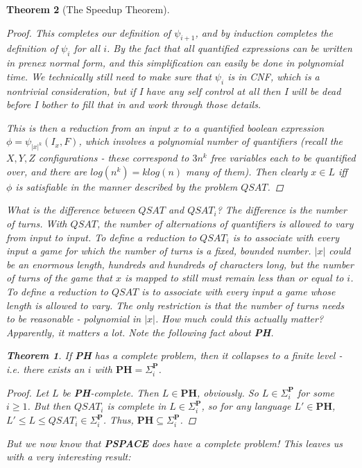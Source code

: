 \documentclass{article}
\theoremstyle{definition}
\theoremstyle{plain}
\theoremstyle{theorem}
\newtheorem{theorem}{Theorem}[section]
\begin{document}
\begin{theorem}[The Speedup Theorem]
\begin{proof}
    \par This completes our definition of $\psi_{i+1}$, and by induction completes the definition of $\psi_i$ for all $i$. By the fact that all quantified expressions can be written in prenex normal form, and this simplification can easily be done in polynomial time. We technically still need to make sure that $\psi_i$ is in CNF, which is a nontrivial consideration, but if I have any self control at all then I will be dead before I bother to fill that in and work through those details.
    \par This is then a reduction from an input $x$ to a quantified boolean expression $\phi = \psi_{|x|^k}(I_x,F)$, which involves a polynomial number of quantifiers (recall the $X,Y,Z$ configurations - these correspond to $3n^k$ free variables each to be quantified over, and there are $log(n^k)=klog(n)$ many of them). Then clearly $x \in L$ iff $\phi$ is satisfiable in the manner described by the problem $QSAT$.  
\end{proof}
What is the difference between $QSAT$ and $QSAT_i$? The difference is the number of turns. With $QSAT$, the number of alternations of quantifiers is allowed to vary from input to input. To define a reduction to $QSAT_i$ is to associate with every input a game for which the number of turns is a fixed, bounded number. $|x|$ could be an enormous length, hundreds and hundreds of characters long, but the number of turns of the game that $x$ is mapped to still must remain less than or equal to $i$. To define a reduction to $QSAT$ is to associate with every input a game whose length is allowed to vary. The only restriction is that the number of turns needs to be reasonable - polynomial in $|x|$. How much could this actually matter? Apparently, it matters a lot. Note the following fact about \textbf{PH}.
\begin{theorem}
    If \textbf{PH} has a complete problem, then it collapses to a finite level - i.e. there exists an $i$ with $\textbf{PH} = \Sigma_i^{\textbf{P}}$. 
\end{theorem}
\begin{proof}
    Let $L$ be \textbf{PH}-complete. Then $L \in \textbf{PH}$, obviously. So $L \in \Sigma_i^{\textbf{P}}$ for some $i \geq 1$. But then $QSAT_i$ is complete in $L \in \Sigma_i^{\textbf{P}}$, so for any language $L' \in \textbf{PH}$, $L' \leq L \leq QSAT_i \in \Sigma_i^{\textbf{P}}$. Thus, $\textbf{PH} \subseteq \Sigma_i^{\textbf{P}}$.
\end{proof}
But we now know that \textbf{PSPACE} does have a complete problem! This leaves us with a very interesting result:

\end{theorem}
\end{document}
